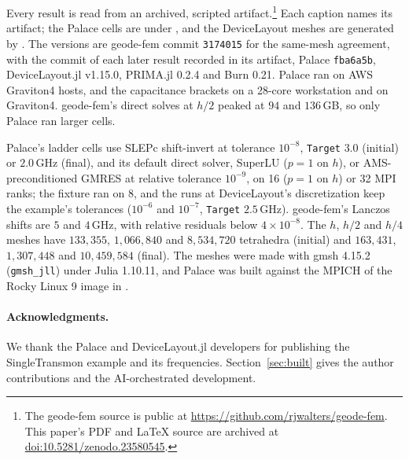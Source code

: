 \documentclass{anvil-paper}
\begin{document}
Every result is read from an archived, scripted artifact.\footnote{The geode-fem source is public at
\url{https://github.com/rjwalters/geode-fem}. This paper's PDF and \LaTeX{}
source are archived at
\href{https://doi.org/10.5281/zenodo.23580545}{doi:10.5281/zenodo.23580545}.}
Each caption names its artifact; the Palace cells are under
, and the DeviceLayout meshes are
generated by . The versions are geode-fem commit
\texttt{3174015} for the same-mesh agreement, with the commit of each later
result recorded in its artifact, Palace \texttt{fba6a5b}, DeviceLayout.jl
v1.15.0, PRIMA.jl 0.2.4 and Burn 0.21. Palace ran on AWS
Graviton4 hosts, and the capacitance brackets on a 28-core workstation and
on Graviton4. geode-fem's
direct solves at $h/2$ peaked at $94$ and $136$\,GB, so only Palace ran
larger cells.

Palace's ladder cells use SLEPc shift-invert at tolerance $10^{-8}$,
\texttt{Target} $3.0$ (initial) or $2.0$\,GHz (final), and its default
direct solver, SuperLU ($p = 1$ on $h$), or AMS-preconditioned GMRES at relative
tolerance $10^{-9}$, on 16 ($p = 1$ on $h$) or 32 MPI ranks; the fixture ran
on 8, and the runs at DeviceLayout's discretization keep the example's
tolerances ($10^{-6}$ and $10^{-7}$, \texttt{Target} $2.5$\,GHz). geode-fem's Lanczos shifts are
$5$ and $4$\,GHz, with relative residuals below $4\times10^{-8}$.
The $h$, $h/2$ and $h/4$ meshes have $133{,}355$, $1{,}066{,}840$ and
$8{,}534{,}720$ tetrahedra (initial) and $163{,}431$, $1{,}307{,}448$ and
$10{,}459{,}584$ (final). The meshes were made
with gmsh 4.15.2 (\texttt{gmsh\_jll}) under Julia 1.10.11, and Palace was
built against the MPICH of the Rocky Linux 9 image in
.

\paragraph{Acknowledgments.}
We thank the Palace and DeviceLayout.jl developers for publishing the
SingleTransmon example and its frequencies. Section~\ref{sec:built} gives
the author contributions and the AI-orchestrated development.



\end{document}
